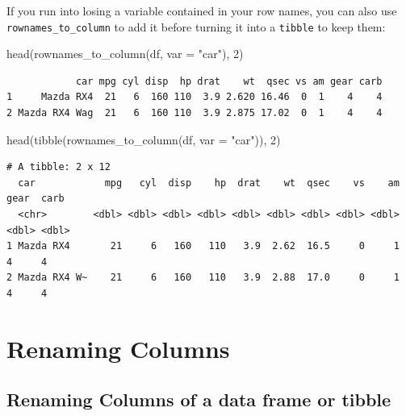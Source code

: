 \documentclass[
]{article}
\newenvironment{Shaded}{\begin{snugshade}}{\end{snugshade}}
\newcommand{\AttributeTok}[1]{\textcolor[rgb]{0.77,0.63,0.00}{#1}}
\newcommand{\DecValTok}[1]{\textcolor[rgb]{0.00,0.00,0.81}{#1}}
\newcommand{\FunctionTok}[1]{\textcolor[rgb]{0.00,0.00,0.00}{#1}}
\newcommand{\NormalTok}[1]{#1}
\newcommand{\StringTok}[1]{\textcolor[rgb]{0.31,0.60,0.02}{#1}}
\begin{document}
If you run into losing a variable contained in your row names, you can
also use \texttt{rownames\_to\_column} to add it before turning it into
a \texttt{tibble} to keep them:

\begin{Shaded}
\begin{Highlighting}[]
\FunctionTok{head}\NormalTok{(}\FunctionTok{rownames\_to\_column}\NormalTok{(df, }\AttributeTok{var =} \StringTok{"car"}\NormalTok{),  }\DecValTok{2}\NormalTok{)}
\end{Highlighting}
\end{Shaded}

\begin{verbatim}
            car mpg cyl disp  hp drat    wt  qsec vs am gear carb
1     Mazda RX4  21   6  160 110  3.9 2.620 16.46  0  1    4    4
2 Mazda RX4 Wag  21   6  160 110  3.9 2.875 17.02  0  1    4    4
\end{verbatim}

\begin{Shaded}
\begin{Highlighting}[]
\FunctionTok{head}\NormalTok{(}\FunctionTok{tibble}\NormalTok{(}\FunctionTok{rownames\_to\_column}\NormalTok{(df, }\AttributeTok{var =} \StringTok{"car"}\NormalTok{)),  }\DecValTok{2}\NormalTok{)}
\end{Highlighting}
\end{Shaded}

\begin{verbatim}
# A tibble: 2 x 12
  car            mpg   cyl  disp    hp  drat    wt  qsec    vs    am  gear  carb
  <chr>        <dbl> <dbl> <dbl> <dbl> <dbl> <dbl> <dbl> <dbl> <dbl> <dbl> <dbl>
1 Mazda RX4       21     6   160   110   3.9  2.62  16.5     0     1     4     4
2 Mazda RX4 W~    21     6   160   110   3.9  2.88  17.0     0     1     4     4
\end{verbatim}

\hypertarget{renaming-columns}{%
\section{Renaming Columns}\label{renaming-columns}}

\hypertarget{renaming-columns-of-a-data-frame-or-tibble}{%
\subsection{Renaming Columns of a data frame or
tibble}\label{renaming-columns-of-a-data-frame-or-tibble}}
\end{document}
